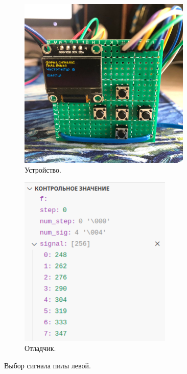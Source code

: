 	\begin{figure}[H]
     \begin{subfigure}[H]{0.5\textwidth}
         \centering
         \includegraphics[width=0.9\textwidth]{../image/test4_u_s.jpg}
         \caption{Устройство.}
     \end{subfigure}
     \hfill
     \begin{subfigure}[H]{0.5\textwidth}
         \centering
         \includegraphics[width=0.8\textwidth]{../image/test4_o_s.png}
         \caption{Отладчик.}
     \end{subfigure}
        \caption{Выбор сигнала пилы левой.}
	\end{figure}
	
